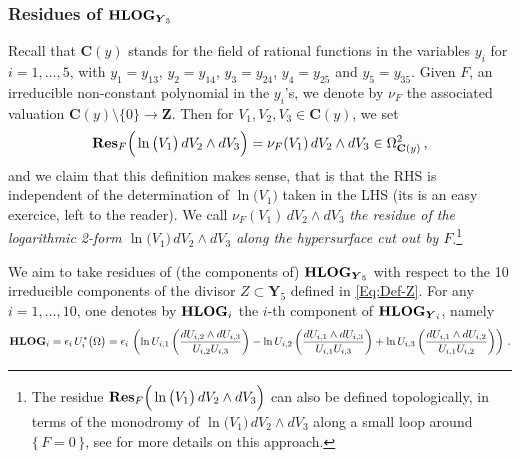 \documentclass[11pt]{amsart}
\begin{document}
\subsubsection{\bf Residues of ${\bf HLOG}_{ \boldsymbol{Y}_5}$}
\label{SS:Residues-HLOG-Y5}
Recall that $\mathbf C(y)$ stands for the field of rational functions in the variables $y_i$ for $i=1,\ldots,5$, with $y_1=y_{13}$, $y_2=y_{14}$, $y_3=y_{24}$, $y_4=y_{25}$ and $y_5=y_{35}$.   Given  $F$, an irreducible non-constant polynomial in the $y_i$'s, we denote by $\nu_F$ the associated valuation $\mathbf C(y)\setminus \{0\}\rightarrow \mathbf Z$.  Then for $V_1,V_2,V_3\in \mathbf C(y)$, we set 
$$
{\bf Res}_F \Big( \ln \big(V_1\big)\, dV_2\wedge dV_3\Big)= \nu_F(V_1)\,dV_2\wedge dV_3
\in \Omega^2_{ \mathbf C(y)}\, , 
$$
and we claim that this 
definition makes sense, that is that the RHS 
is 
independent of the determination of $ \ln \big(V_1\big)$ taken in the LHS (its is 
an easy exercice, left to the reader).  We call $\nu_F(V_1)\,dV_2\wedge dV_3$ {\it the residue of 
the logarithmic 2-form $\ln \big(V_1\big)\, dV_2\wedge dV_3$ along the hypersurface cut out by $F$}.\footnote{The residue ${\bf Res}_F \Big( \ln \big(V_1\big)\, dV_2\wedge dV_3\Big)$ can also be defined topologically, in terms of the monodromy of 
$\ln \big(V_1\big)\, dV_2\wedge dV_3$ along a small loop around $\{\,F=0\,\}$, see \cite[\S2.2.6]{PirioAFST} 
for more details on this approach.}


We aim to take residues of (the components of) ${\bf HLOG}_{ \boldsymbol{Y}_5}$ with respect to the 10 irreducible components of the divisor $Z\subset \boldsymbol{Y}_5$ defined in \eqref{Eq:Def-Z}.   For any $i=1,\ldots,10$, one denotes by ${\bf HLOG}_i$ the $i$-th component of ${\bf HLOG}_{\boldsymbol{Y}_i}$, namely 
\begin{equation}%
{\bf HLOG}_{i}= \epsilon_i\, U_i^*\big( \Omega\big)= \epsilon_i\,\left(
\ln U_{i,1}  \left( 
\frac{dU_{i,2}\wedge dU_{i,3}}{ U_{i,2}U_{i,3}}
\right)-
\ln U_{i,2}
 \left( 
\frac{dU_{i,1}\wedge dU_{i,3}}{ U_{i,1}U_{i,3}}
\right)
+ \ln U_{i,3} \left( 
\frac{dU_{i,1}\wedge dU_{i,2}}{ U_{i,1}U_{i,2}}
\right)\right)\, .
\end{equation}%
\end{document}
